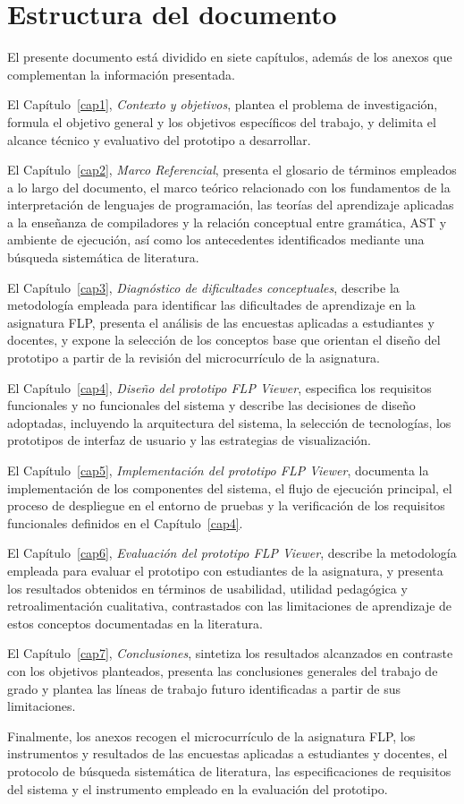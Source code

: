 \section{Estructura del documento}

El presente documento está dividido en siete capítulos, además de los anexos que complementan la información presentada.

El Capítulo~\ref{cap1}, \textit{Contexto y objetivos}, plantea el problema de investigación, formula el objetivo general y los objetivos específicos del trabajo, y delimita el alcance técnico y evaluativo del prototipo a desarrollar.

El Capítulo~\ref{cap2}, \textit{Marco Referencial}, presenta el glosario de términos empleados a lo largo del documento, el marco teórico relacionado con los fundamentos de la interpretación de lenguajes de programación, las teorías del aprendizaje aplicadas a la enseñanza de compiladores y la relación conceptual entre gramática, AST y ambiente de ejecución, así como los antecedentes identificados mediante una búsqueda sistemática de literatura.

El Capítulo~\ref{cap3}, \textit{Diagnóstico de dificultades conceptuales}, describe la metodología empleada para identificar las dificultades de aprendizaje en la asignatura FLP, presenta el análisis de las encuestas aplicadas a estudiantes y docentes, y expone la selección de los conceptos base que orientan el diseño del prototipo a partir de la revisión del microcurrículo de la asignatura.

El Capítulo~\ref{cap4}, \textit{Diseño del prototipo FLP Viewer}, especifica los requisitos funcionales y no funcionales del sistema y describe las decisiones de diseño adoptadas, incluyendo la arquitectura del sistema, la selección de tecnologías, los prototipos de interfaz de usuario y las estrategias de visualización.

El Capítulo~\ref{cap5}, \textit{Implementación del prototipo FLP Viewer}, documenta la implementación de los componentes del sistema, el flujo de ejecución principal, el proceso de despliegue en el entorno de pruebas y la verificación de los requisitos funcionales definidos en el Capítulo~\ref{cap4}.

El Capítulo~\ref{cap6}, \textit{Evaluación del prototipo FLP Viewer}, describe la metodología empleada para evaluar el prototipo con estudiantes de la asignatura, y presenta los resultados obtenidos en términos de usabilidad, utilidad pedagógica y retroalimentación cualitativa, contrastados con las limitaciones de aprendizaje de estos conceptos documentadas en la literatura.

El Capítulo~\ref{cap7}, \textit{Conclusiones}, sintetiza los resultados alcanzados en contraste con los objetivos planteados, presenta las conclusiones generales del trabajo de grado y plantea las líneas de trabajo futuro identificadas a partir de sus limitaciones.

Finalmente, los anexos recogen el microcurrículo de la asignatura FLP, los instrumentos y resultados de las encuestas aplicadas a estudiantes y docentes, el protocolo de búsqueda sistemática de literatura, las especificaciones de requisitos del sistema y el instrumento empleado en la evaluación del prototipo.